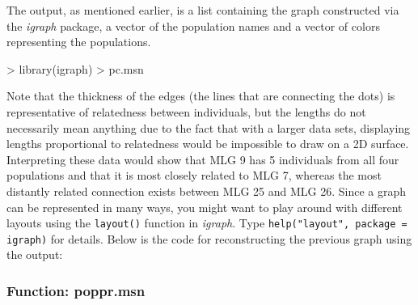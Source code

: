 \documentclass[letterpaper]{article}
\begin{document}
The output, as mentioned earlier, is a list containing the graph constructed via the \textit{igraph} package, a vector of the population names and a vector of colors representing the populations.
\begin{Schunk}
\begin{Sinput}
> library(igraph)
> pc.msn
\end{Sinput}
\end{Schunk}

Note that the thickness of the edges (the lines that are connecting the dots) is representative of relatedness between individuals, but the lengths do not necessarily mean anything due to the fact that with a larger data sets, displaying lengths proportional to relatedness would be impossible to draw on a 2D surface. Interpreting these data would show that MLG 9 has 5 individuals from all four populations and that it is most closely related to MLG 7, whereas the most distantly related connection exists between MLG 25 and MLG 26.
\newpage
Since a graph can be represented in many ways, you might want to play around with different layouts using the \texttt{layout()} function in \textit{igraph}. Type \texttt{help("layout", package = igraph)} for details. Below is the code for reconstructing the previous graph using the output:
\begin{Schunk}
\end{Schunk}

\subsubsection{Function: poppr.msn}\label{index:trees:poppr.msn}
\end{document}
